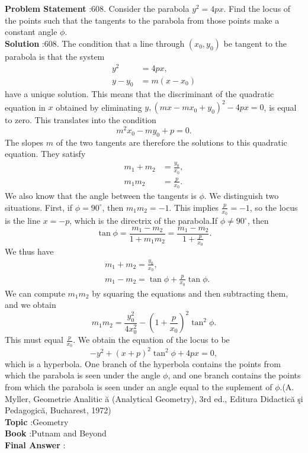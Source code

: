 \documentclass[10pt]{article}
\begin{document}
\textbf{Problem Statement} :608. Consider the parabola $y^{2}=4 p x$. Find the locus of the points such that the tangents to the parabola from those points make a constant angle $\phi$.\\
\textbf{Solution} :608. The condition that a line through $\left(x_{0}, y_{0}\right)$ be tangent to the parabola is that the system$$ \begin{aligned} y^{2} &=4 p x, \\ y-y_{0} &=m\left(x-x_{0}\right) \end{aligned} $$have a unique solution. This means that the discriminant of the quadratic equation in $x$ obtained by eliminating $y,\left(m x-m x_{0}+y_{0}\right)^{2}-4 p x=0$, is equal to zero. This translates into the condition$$ m^{2} x_{0}-m y_{0}+p=0 . $$The slopes $m$ of the two tangents are therefore the solutions to this quadratic equation. They satisfy $$ \begin{aligned} m_{1}+m_{2} &=\frac{y_{0}}{x_{0}}, \\ m_{1} m_{2} &=\frac{p}{x_{0}} . \end{aligned} $$We also know that the angle between the tangents is $\phi$. We distinguish two situations. First, if $\phi=90^{\circ}$, then $m_{1} m_{2}=-1$. This implies $\frac{p}{x_{0}}=-1$, so the locus is the line $x=-p$, which is the directrix of the parabola.If $\phi \neq 90^{\circ}$, then$$ \tan \phi=\frac{m_{1}-m_{2}}{1+m_{1} m_{2}}=\frac{m_{1}-m_{2}}{1+\frac{p}{x_{0}}} . $$We thus have$$ \begin{aligned} &m_{1}+m_{2}=\frac{y_{0}}{x_{0}}, \\ &m_{1}-m_{2}=\tan \phi+\frac{p}{x_{0}} \tan \phi . \end{aligned} $$We can compute $m_{1} m_{2}$ by squaring the equations and then subtracting them, and we obtain$$ m_{1} m_{2}=\frac{y_{0}^{2}}{4 x_{0}^{2}}-\left(1+\frac{p}{x_{0}}\right)^{2} \tan ^{2} \phi . $$This must equal $\frac{p}{x_{0}}$. We obtain the equation of the locus to be$$ -y^{2}+(x+p)^{2} \tan ^{2} \phi+4 p x=0, $$which is a hyperbola. One branch of the hyperbola contains the points from which the parabola is seen under the angle $\phi$, and one branch contains the points from which the parabola is seen under an angle equal to the suplement of $\phi$.(A. Myller, Geometrie Analitic ă (Analytical Geometry), 3rd ed., Editura Didactică şi Pedagogică, Bucharest, 1972)\\
\textbf{Topic} :Geometry\\
\textbf{Book} :Putnam and Beyond\\
\textbf{Final Answer} :\\
\end{document}
